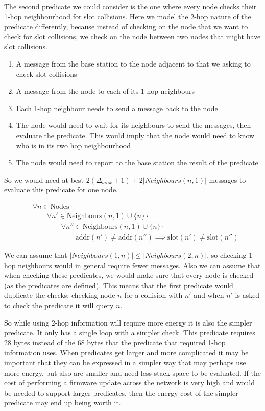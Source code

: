 The second predicate we could consider is the one where every node checks their 1-hop neighbourhood for slot collisions. Here we model the 2-hop nature of the predicate differently, because instead of checking on the node that we want to check for slot collisions, we check on the node between two nodes that might have slot collisions.

\begin{enumerate}
	\item A message from the base station to the node adjacent to that we asking to check slot collisions
	\item A message from the node to each of its 1-hop neighbours
	\item Each 1-hop neighbour needs to send a message back to the node
	\item The node would need to wait for its neighbours to send the messages, then evaluate the predicate. This would imply that the node would need to know who is in its two hop neighbourhood
	\item The node would need to report to the base station the result of the predicate
\end{enumerate}

So we would need at best $2(\Delta_{sink} + 1) + 2|Neighbours(n, 1)|$ messages to evaluate this predicate for one node.

\begin{align}
\label{eq:1-hop-slot-pred}
&				\forall n \in \text{Nodes} \cdot \\
& \hspace{2em}		\forall n' \in \text{Neighbours}(n, 1) \cup \{n\} \cdot \\
& \hspace{4em}			\forall n'' \in \text{Neighbours}(n, 1) \cup \{n\} \cdot \\
& \hspace{6em}				\text{addr}(n') \not= \text{addr}(n'') \implies \text{slot}(n') \neq \text{slot}(n'')
\end{align}

We can assume that $|Neighbours(1, n)| \leq |Neighbours(2, n)|$, so checking 1-hop neighbours would in general require fewer messages. Also we can assume that when checking these predicates, we would make sure that every node is checked (as the predicates are defined). This means that the first predicate would duplicate the checks: checking node $n$ for a collision with $n'$ and when $n'$ is asked to check the predicate it will query $n$.

So while using 2-hop information will require more energy it is also the simpler predicate. It only has a single loop with a simpler check. This predicate requires 28 bytes instead of the 68 bytes that the predicate that required 1-hop information uses. When predicates get larger and more complicated it may be important that they can be expressed in a simpler way that may perhaps use more energy, but also are smaller and need less stack space to be evaluated. If the cost of performing a firmware update across the network is very high and would be needed to support larger predicates, then the energy cost of the simpler predicate may end up being worth it.


